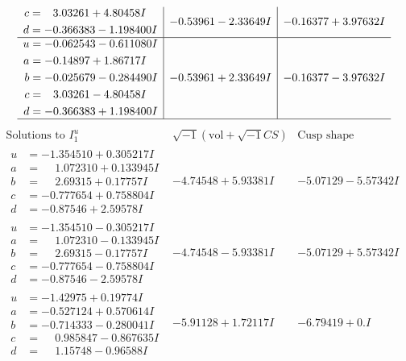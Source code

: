 \documentclass[1p]{elsarticle_modified}
\theoremstyle{definition}
\newcommand{\I}{\sqrt{-1}}
\begin{document}
$$\begin{array}{c|c|c}
\begin{aligned}
c &= \phantom{-}3.03261 + 4.80458 I \\
d &= -0.366383 - 1.198400 I\end{aligned}
 & -0.53961 - 2.33649 I & -0.16377 + 3.97632 I \\ \hline\begin{aligned}
u &= -0.062543 - 0.611080 I \\
a &= -0.14897 + 1.86717 I \\
b &= -0.025679 - 0.284490 I \\
c &= \phantom{-}3.03261 - 4.80458 I \\
d &= -0.366383 + 1.198400 I\end{aligned}
 & -0.53961 + 2.33649 I & -0.16377 - 3.97632 I\\
 \hline 
 \end{array}$$\newpage$$\begin{array}{c|c|c}  
\text{Solutions to }I^u_{1}& \I (\text{vol} + \sqrt{-1}CS) & \text{Cusp shape}\\
 \hline 
\begin{aligned}
u &= -1.354510 + 0.305217 I \\
a &= \phantom{-}1.072310 + 0.133945 I \\
b &= \phantom{-}2.69315 + 0.17757 I \\
c &= -0.777654 + 0.758804 I \\
d &= -0.87546 + 2.59578 I\end{aligned}
 & -4.74548 + 5.93381 I & -5.07129 - 5.57342 I \\ \hline\begin{aligned}
u &= -1.354510 - 0.305217 I \\
a &= \phantom{-}1.072310 - 0.133945 I \\
b &= \phantom{-}2.69315 - 0.17757 I \\
c &= -0.777654 - 0.758804 I \\
d &= -0.87546 - 2.59578 I\end{aligned}
 & -4.74548 - 5.93381 I & -5.07129 + 5.57342 I \\ \hline\begin{aligned}
u &= -1.42975 + 0.19774 I \\
a &= -0.527124 + 0.570614 I \\
b &= -0.714333 - 0.280041 I \\
c &= \phantom{-}0.985847 - 0.867635 I \\
d &= \phantom{-}1.15748 - 0.96588 I\end{aligned}
 & -5.91128 + 1.72117 I & -6.79419 + 0. I\phantom{ +0.000000I} \\ \hline\begin{aligned}

\end{aligned}
\end{array}$$
\end{document}
